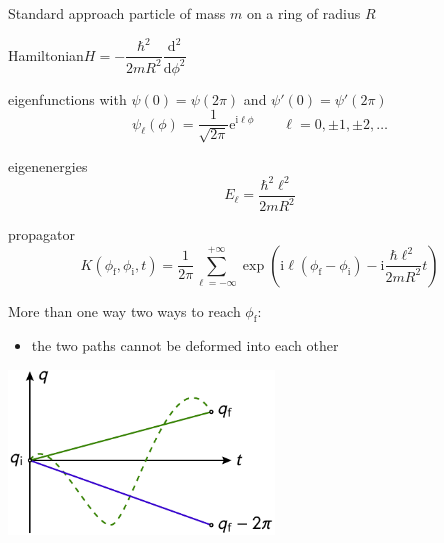\documentclass[t,dvipsnames]{beamer}
\begin{document}
\begin{frame}[c]{}
 \begin{center}
  \begin{minipage}{0.8\textwidth}
   \tableofcontents[currentsection]
  \end{minipage}
 \end{center}
\end{frame}

\begin{frame}[t]{Standard approach}
 particle of mass $m$ on a ring of radius $R$

 \vspace{0.3truecm}
 Hamiltonian\quad $H = -\dfrac{\hbar^2}{2mR^2}\dfrac{\text{d}^2}{\text{d}\phi^2}$

 \vspace{0.5truecm}
 eigenfunctions with $\psi(0) = \psi(2\pi)$ and $\psi'(0) = \psi'(2\pi)$
 \begin{displaymath}
  \psi_\ell(\phi) = \frac{1}{\sqrt{2\pi}}\text{e}^{\text{i}\ell\phi}\qquad
  \ell = 0, \pm1, \pm2, \ldots
 \end{displaymath}

 eigenenergies
 \begin{displaymath}
  E_\ell = \frac{\hbar^2\ell^2}{2mR^2}
 \end{displaymath}

 propagator
 \begin{displaymath}
  K(\phi_\text{f}, \phi_\text{i}, t) = \frac{1}{2\pi}\sum_{\ell=-\infty}^{+\infty}
	 \exp\left(\text{i}\ell(\phi_\text{f}-\phi_\text{i})
		   -\text{i}\frac{\hbar\ell^2}{2mR^2}t\right)
 \end{displaymath}
\end{frame}

\begin{frame}[t]{More than one way}
 two ways to reach $\phi_\text{f}$:\qquad

 \vspace{0.5truecm}
 \begin{itemize}
  \item the two paths cannot be deformed into each other
 \end{itemize}
 \begin{center}
  \includegraphics[width=0.53\textwidth]{ring_deform}
 \end{center}
\end{frame}
\end{document}
